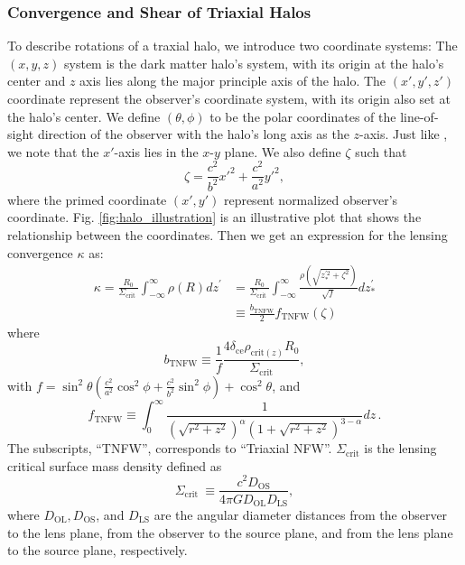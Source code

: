 \documentclass[twocolumn, usenames, dvipsnames]{aastex63}
\begin{document}
\subsubsection{Convergence and Shear of Triaxial Halos}

To describe rotations of a traxial halo, we introduce two coordinate systems:
The $(x, y, z)$ system is the dark matter halo's system, with its origin at
the halo's center and $z$ axis lies along the major principle axis of the halo.
The $(x', y', z')$ coordinate represent the observer's coordinate system, with
its origin also set at the halo's center. We define $(\theta, \phi)$ to be the
polar coordinates of the line-of-sight direction of the observer with the
halo's long axis as the $z$-axis. Just like \cite{halo_OLS03}, we note that the
$x'$-axis lies in the $x$-$y$ plane. We also define $\zeta$ such that
\begin{equation}
    \zeta = \frac{c^2}{b^2} x'^2 + \frac{c^2}{a^2} y'^2,
\end{equation}
where the primed coordinate $(x', y')$ represent normalized observer's
coordinate. Fig. \ref{fig:halo_illustration} is an illustrative plot that shows
the relationship between the coordinates. Then we get an expression for the
lensing convergence $\kappa$ as:
\begin{equation}\begin{aligned}
\label{eq:tiaxial_kappa}
    \kappa=\frac{R_{0}}{\Sigma_{\text {crit }}}
    \int_{-\infty}^{\infty} \rho(R) d z^{\prime}
    &=\frac{R_{0}}{\Sigma_{\text {crit }}} \int_{-\infty}^{\infty}
    \frac{\rho\left(\sqrt{z_{*}^{\prime 2}
    +\zeta^{2}}\right)}{\sqrt{f}} d z_{*}^{\prime} \\
    & \equiv \frac{b_{\mathrm{TNFW}}}{2} f_{\mathrm{TNFW}}(\zeta)\,
\end{aligned}\end{equation}
where
\begin{equation}
    b_{\mathrm{TNFW}}\equiv \frac{1}{f}
    \frac{4\delta_{\mathrm{ce}}\rho_{\mathrm{crit}(z)} R_0}{\Sigma_{\mathrm{crit}}},
\end{equation}
with $f = \sin^2\theta (\frac{c^2}{a^2} \cos^2\phi + \frac{c^2}{b^2}\sin^2\phi)
+ \cos^2\theta $, and
\begin{equation}
    f_{\mathrm{TNFW}} \equiv
    \int^\infty_{0}
    \frac{1}{(\sqrt{r^2 + z^2})^\alpha(1+\sqrt{r^2+z^2})^{3-\alpha}} dz \,.
\end{equation}
The subscripts, ``TNFW'', corresponds to ``Triaxial NFW''. $\Sigma_{\text
{crit}}$ is the lensing critical surface mass density defined as
$$
\Sigma_{\text {crit }} \equiv \frac{c^2 D_{\mathrm{OS}}}{4 \pi G
D_{\mathrm{OL}} D_{\mathrm{LS}}},
$$
where $D_{\mathrm{OL}}, D_{\mathrm{OS}}$,
and $D_{\mathrm{LS}}$ are the angular diameter distances from the observer to
the lens plane, from the observer to the source plane, and from the lens plane
to the source plane, respectively.
\end{document}
